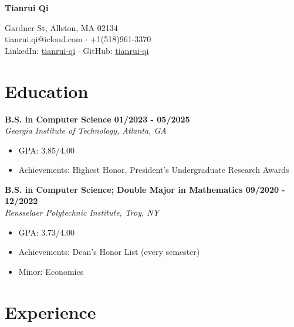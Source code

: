 \documentclass[letterpaper, 11pt]{article}
\newcommand{\subsectionvspace}{\vspace{8pt}}
\begin{document}
\begin{minipage}[t]{0.3\textwidth}
    \vspace*{0\baselineskip}\textbf{\huge Tianrui Qi}
\end{minipage}%
\begin{minipage}[t]{0.7\textwidth}
     Gardner St, Allston, MA 02134
    \\
    tianrui.qi@icloud.com 
    $\cdot$ 
    +1(518)961-3370
    \\
    LinkedIn: \href{https://www.linkedin.com/in/tianrui-qi/}{tianrui-qi}
    $\cdot$
    GitHub: \href{https://github.com/tianrui-qi}{tianrui-qi}
\end{minipage}


\section{Education}


    \textbf{B.S. in Computer Science \hfill 01/2023 - 05/2025} \\
    \textit{Georgia Institute of Technology, Atlanta, GA}
    \begin{itemize}
        \item GPA: 3.85/4.00
        \item Achievements: Highest Honor, President's Undergraduate Research Awards
    \end{itemize}

    \subsectionvspace

    \textbf{B.S. in Computer Science; Double Major in Mathematics \hfill 09/2020 - 12/2022} \\
    \textit{Rensselaer Polytechnic Institute, Troy, NY}
    \begin{itemize}
        \item GPA: 3.73/4.00
        \item Achievements: Dean's Honor List (every semester)
        \item Minor: Economics
    \end{itemize}


\section{Experience}
\end{document}
